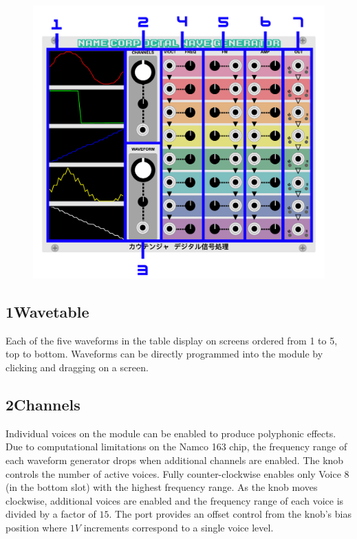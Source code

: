 \documentclass[12pt,letter]{article}
\begin{document}
\begin{figure}[!htp]
\centering
\includegraphics[width=\maxwidth{\textwidth}]{Interface}
\end{figure}

\subsection*{1{\quad}Wavetable}

Each of the five waveforms in the table display on screens ordered from 1 to 5, top to bottom. Waveforms can be directly programmed into the module by clicking and dragging on a screen.

\subsection*{2{\quad}Channels}

Individual voices on the module can be enabled to produce polyphonic effects. Due to computational limitations on the Namco 163 chip, the frequency range of each waveform generator drops when additional channels are enabled. The knob controls the number of active voices. Fully counter-clockwise enables only Voice 8 (in the bottom slot) with the highest frequency range. As the knob moves clockwise, additional voices are enabled and the frequency range of each voice is divided by a factor of $15$. The port provides an offset control from the knob's bias position where $1V$ increments correspond to a single voice level.
\end{document}
